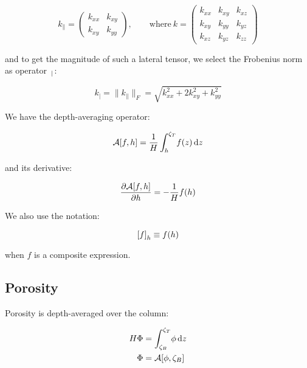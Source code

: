 \documentclass[12pt]{scrartcl}
\newcommand{\aleft}{\mathopen{}\mathclose\bgroup\left}  %
\newcommand{\aright}{\aftergroup\egroup\right}          %
\newcommand{\at}[2]{\left[ #1 \right]_{#2}}             %
\newcommand{\der}[2]{\frac{\partial{#1}}{\partial{#2}}}       %
\newcommand{\intg}[4]{\int_{#1}^{#2}\!{#3}\,\mathrm{d}{#4}}   %
\newcommand{\latr}[1]{{#1}_{\|}}                              %
\newcommand{\magn}[1]{{#1}_|}                                 %
\newcommand{\Hei}{H}        %
\newcommand{\Por}{\Phi}     %
\newcommand{\por}{\phi}     %
\newcommand{\prm}{k}        %
\newcommand{\Lev}{\zeta}    %
\newcommand{\Top}{T}        %
\newcommand{\Bot}{B}        %
\newcommand{\dph}{z}        %
\newcommand{\x}{x}
\newcommand{\y}{y}
\newcommand{\z}{z}
\newcommand{\avg}[2]{\mathcal{A}\aleft[#1, #2\aright]}  %
\newcommand{\f}{f}          %
\newcommand{\h}{h}          %
\newcommand{\LevT}{\Lev_\Top}
\newcommand{\LevB}{\Lev_\Bot}
\begin{document}
\begin{equation}
\latr{ \prm } = \begin{pmatrix}
\prm_{\x\x} & \prm_{\x\y} \\
\prm_{\x\y} & \prm_{\y\y}
\end{pmatrix}, \qquad \mathrm{where\ }
\prm = \begin{pmatrix}
\prm_{\x\x} & \prm_{\x\y} & \prm_{\x\z} \\
\prm_{\x\y} & \prm_{\y\y} & \prm_{\y\z} \\
\prm_{\x\z} & \prm_{\y\z} & \prm_{\z\z}
\end{pmatrix}
\end{equation}

and to get the magnitude of such a lateral tensor, we select the Frobenius norm as operator~\( \magn{ \hspace{ 0ex } } \):

\begin{equation}
\magn{ \prm } = \| \latr{ \prm } \|_F = \sqrt{ \prm_{\x\x}^2 + 2\prm_{\x\y}^2 + \prm_{\y\y}^2 }
\end{equation}

We have the depth-averaging operator:

\begin{equation}
\avg{ \f }{ \h } = \frac{ 1 }{ \Hei } \intg{ \h }{ \LevT }{ \f \aleft( \dph \aright) }{ \dph }
\end{equation}

and its derivative:

\begin{equation}
\der{ \avg{ \f }{ \h } }{ \h } = - \frac{ 1 }{ \Hei } \f \aleft( \h \aright)
\end{equation}

We also use the notation:

\begin{equation}
\at{ \f }{ \h } \equiv \f \aleft( \h \aright)
\end{equation}

when \( \f \) is a composite expression.

\subsection{Porosity}
Porosity is depth-averaged over the column:

\begin{align}
\Hei \Por &= \intg{ \LevB }{ \LevT }{ \por }{ \dph } \\
\Por &= \avg{ \por }{ \LevB }
\end{align}
\end{document}

